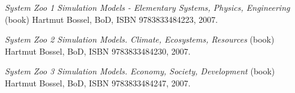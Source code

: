 \item
{\it System Zoo 1 Simulation Models - Elementary Systems, Physics, Engineering} (book)\crlf
Hartmut Bossel, BoD, ISBN 9783833484223, 2007.

\item
{\it System Zoo 2 Simulation Models. Climate, Ecosystems, Resources} (book)\crlf
Hartmut Bossel, BoD, ISBN 9783833484230, 2007.

\item
{\it System Zoo 3 Simulation Models. Economy, Society, Development} (book)\crlf
Hartmut Bossel, BoD, ISBN 9783833484247, 2007.
\stopitemize

